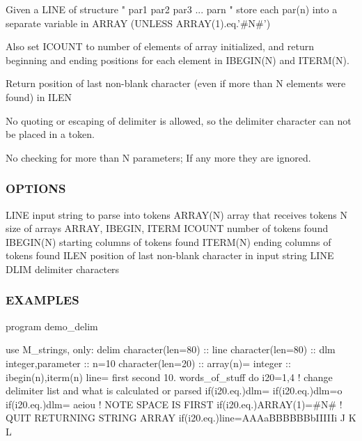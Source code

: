 \begin{DoxyVerb}  Given a LINE of structure " par1 par2 par3 ... parn "
  store each par(n) into a separate variable in ARRAY (UNLESS
  ARRAY(1).eq.'#N#')

  Also set ICOUNT to number of elements of array initialized, and
  return beginning and ending positions for each element in IBEGIN(N)
  and ITERM(N).

  Return position of last non-blank character (even if more
  than N elements were found) in ILEN

  No quoting or escaping of delimiter is allowed, so the delimiter
  character can not be placed in a token.

  No checking for more than N parameters; If any more they are ignored.
\end{DoxyVerb}


\subsubsection*{O\+P\+T\+I\+O\+NS}

L\+I\+NE input string to parse into tokens A\+R\+R\+A\+Y(\+N) array that receives tokens N size of arrays A\+R\+R\+AY, I\+B\+E\+G\+IN, I\+T\+E\+RM I\+C\+O\+U\+NT number of tokens found I\+B\+E\+G\+I\+N(\+N) starting columns of tokens found I\+T\+E\+R\+M(\+N) ending columns of tokens found I\+L\+EN position of last non-\/blank character in input string L\+I\+NE D\+L\+IM delimiter characters

\subsubsection*{E\+X\+A\+M\+P\+L\+ES}

program demo\+\_\+delim

use M\+\_\+strings, only\+: delim character(len=80) \+:\+: line character(len=80) \+:\+: dlm integer,parameter \+:\+: n=10 character(len=20) \+:\+: array(n)=\textquotesingle{} \textquotesingle{} integer \+:\+: ibegin(n),iterm(n) line=\textquotesingle{} first second 10. words\+\_\+of\+\_\+stuff \textquotesingle{} do i20=1,4 ! change delimiter list and what is calculated or parsed if(i20.\+eq.)dlm=\textquotesingle{} \textquotesingle{} if(i20.\+eq.)dlm=\textquotesingle{}o\textquotesingle{} if(i20.\+eq.)dlm=\textquotesingle{} aeiou\textquotesingle{} ! N\+O\+TE S\+P\+A\+CE IS F\+I\+R\+ST if(i20.\+eq.)A\+R\+R\+A\+Y(1)=\textquotesingle{}\#N\#\textquotesingle{} ! Q\+U\+IT R\+E\+T\+U\+R\+N\+I\+NG S\+T\+R\+I\+NG A\+R\+R\+AY if(i20.\+eq.)line=\textquotesingle{}A\+A\+Aa\+B\+B\+B\+B\+B\+Bb\+I\+I\+I\+I\+Ii J K L\textquotesingle{}

